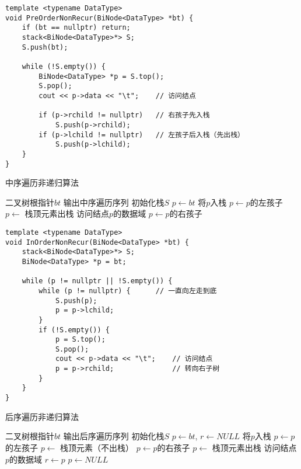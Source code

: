 \documentclass[12pt,a4paper]{amsart}
\begin{document}
\begin{lstlisting}[caption=前序遍历非递归实现]
template <typename DataType>
void PreOrderNonRecur(BiNode<DataType> *bt) {
    if (bt == nullptr) return;
    stack<BiNode<DataType>*> S;
    S.push(bt);
    
    while (!S.empty()) {
        BiNode<DataType> *p = S.top();
        S.pop();
        cout << p->data << "\t";    // 访问结点
        
        if (p->rchild != nullptr)   // 右孩子先入栈
            S.push(p->rchild);
        if (p->lchild != nullptr)   // 左孩子后入栈（先出栈）
            S.push(p->lchild);
    }
}
\end{lstlisting}

\begin{algorithm}[H]
\caption{中序遍历非递归算法}
\begin{algorithmic}[1]
\REQUIRE 二叉树根指针$bt$
\ENSURE 输出中序遍历序列
\STATE 初始化栈$S$
\STATE $p \leftarrow bt$
        \STATE 将$p$入栈
        \STATE $p \leftarrow p$的左孩子
    \ENDWHILE
        \STATE $p \leftarrow$ 栈顶元素出栈
        \STATE 访问结点$p$的数据域
        \STATE $p \leftarrow p$的右孩子
    \ENDIF
\ENDWHILE
\end{algorithmic}
\end{algorithm}

\begin{lstlisting}[caption=中序遍历非递归实现]
template <typename DataType>
void InOrderNonRecur(BiNode<DataType> *bt) {
    stack<BiNode<DataType>*> S;
    BiNode<DataType> *p = bt;
    
    while (p != nullptr || !S.empty()) {
        while (p != nullptr) {      // 一直向左走到底
            S.push(p);
            p = p->lchild;
        }
        if (!S.empty()) {
            p = S.top();
            S.pop();
            cout << p->data << "\t";    // 访问结点
            p = p->rchild;              // 转向右子树
        }
    }
}
\end{lstlisting}

\begin{algorithm}[H]
\caption{后序遍历非递归算法}
\begin{algorithmic}[1]
\REQUIRE 二叉树根指针$bt$
\ENSURE 输出后序遍历序列
\STATE 初始化栈$S$
\STATE $p \leftarrow bt$, $r \leftarrow NULL$
        \STATE 将$p$入栈
        \STATE $p \leftarrow p$的左孩子
    \ELSE
        \STATE $p \leftarrow$ 栈顶元素（不出栈）
            \STATE $p \leftarrow p$的右孩子
        \ELSE
            \STATE $p \leftarrow$ 栈顶元素出栈
            \STATE 访问结点$p$的数据域
            \STATE $r \leftarrow p$
            \STATE $p \leftarrow NULL$
        \ENDIF
    \ENDIF
\ENDWHILE
\end{algorithmic}
\end{algorithm}
\end{document}
